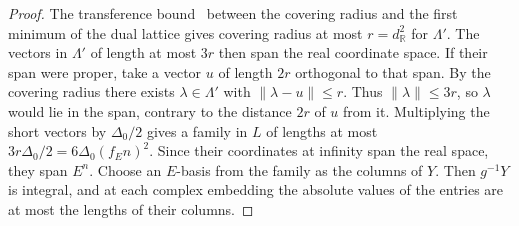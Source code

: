 \begin{proof}
The transference bound~\cite{LLS1990} between the covering radius and the first minimum of the dual lattice gives covering radius at most $r=d_{\mathbb R}^2$ for $\Lambda'$. The vectors in $\Lambda'$ of length at most $3r$ then span the real coordinate space. If their span were proper, take a vector $u$ of length $2r$ orthogonal to that span. By the covering radius there exists $\lambda\in\Lambda'$ with $\|\lambda-u\|\le r$. Thus $\|\lambda\|\le3r$, so $\lambda$ would lie in the span, contrary to the distance $2r$ of $u$ from it. Multiplying the short vectors by $\Delta_0/2$ gives a family in $L$ of lengths at most $3r\Delta_0/2=6\Delta_0(f_E n)^2$. Since their coordinates at infinity span the real space, they span $E^n$. Choose an $E$-basis from the family as the columns of $Y$. Then $g^{-1}Y$ is integral, and at each complex embedding the absolute values of the entries are at most the lengths of their columns.
\end{proof}

